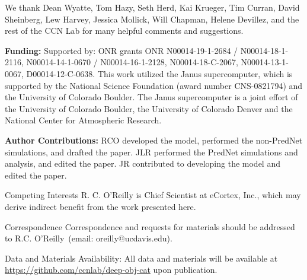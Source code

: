 \documentclass[12pt,twoside]{naturefigs}  %
\newif\myifpdf
\begin{document}


\begin{addendum}
 \item We thank Dean Wyatte, Tom Hazy, Seth Herd, Kai Krueger, Tim Curran, David Sheinberg, Lew Harvey, Jessica Mollick, Will Chapman, Helene Devillez, and the rest of the CCN Lab for many helpful comments and suggestions.

  {\bf Funding:} Supported by: ONR grants ONR N00014-19-1-2684 / N00014-18-1-2116, N00014-14-1-0670 / N00014-16-1-2128, N00014-18-C-2067, N00014-13-1-0067, D00014-12-C-0638.  This work utilized the Janus supercomputer, which is supported by the National Science Foundation (award number CNS-0821794) and the University of Colorado Boulder. The Janus supercomputer is a joint effort of the University of Colorado Boulder, the University of Colorado Denver and the National Center for Atmospheric Research.

 {\bf Author Contributions:} RCO developed the model, performed the non-PredNet simulations, and drafted the paper. JLR performed the PredNet simulations and analysis, and edited the paper.  JR contributed to developing the model and edited the paper.
 \item[Competing Interests] R. C. O'Reilly is Chief Scientist at eCortex, Inc., which may derive indirect benefit from the work presented here.
 \item[Correspondence] Correspondence and requests for materials
should be addressed to R.C. O'Reilly~(email: oreilly@ucdavis.edu).
\item[Data and Materials Availability:]  All data and materials will be available at \url{https://github.com/ccnlab/deep-obj-cat} upon publication.
\end{addendum}

% 
% 
% 
\end{document}
